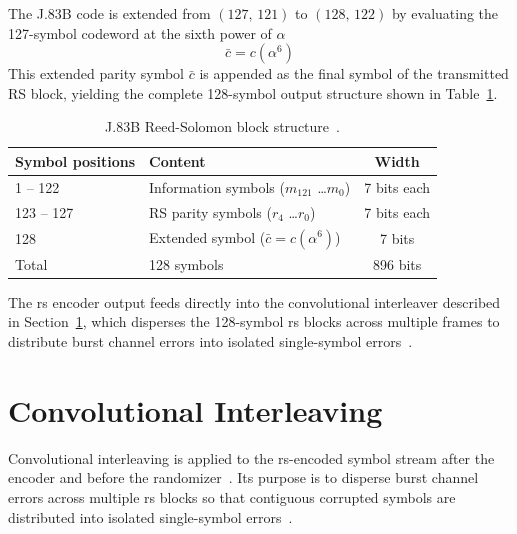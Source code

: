 The J.83B code is extended from $(127,\,121)$ to $(128,\,122)$
by evaluating the 127-symbol codeword at the sixth power of
$\alpha$~\cite{ITU_J83}
\begin{equation}
  \bar{c} = c(\alpha^6)
  \label{eq:rs_extended_symbol}
\end{equation}
\noindent This extended parity symbol $\bar{c}$ is appended as the
final symbol of the transmitted RS block, yielding the complete
128-symbol output structure shown in Table~\ref{tab:rs_block}.

\begin{table}[htbp]
  \caption{J.83B Reed-Solomon block structure~\cite{ITU_J83}.}
  \label{tab:rs_block}
  \centering
  \begin{tabular}{llc}
    \hline
    Symbol positions & Content & Width \\
    \hline
    1 -- 122   & Information symbols ($m_{121}$ \ldots $m_0$) & 7 bits each \\
    123 -- 127 & RS parity symbols ($r_4$ \ldots $r_0$)       & 7 bits each \\
    128        & Extended symbol ($\bar{c} = c(\alpha^6)$)    & 7 bits \\
    \hline
    Total      & 128 symbols                                   & 896 bits \\
    \hline
  \end{tabular}
\end{table}

The \ac{rs} encoder output feeds directly into the convolutional
interleaver described in Section~\ref{sec:interleaving}, which
disperses the 128-symbol \ac{rs} blocks across multiple frames to
distribute burst channel errors into isolated single-symbol
errors~\cite{ITU_J83}.

\section{Convolutional Interleaving}
\label{sec:interleaving}

Convolutional interleaving is applied to the \ac{rs}-encoded symbol
stream after the encoder and before the randomizer~\cite{ITU_J83}.
Its purpose is to disperse burst channel errors across multiple
\ac{rs} blocks so that contiguous corrupted symbols are distributed
into isolated single-symbol errors~\cite{ITU_J83}.


